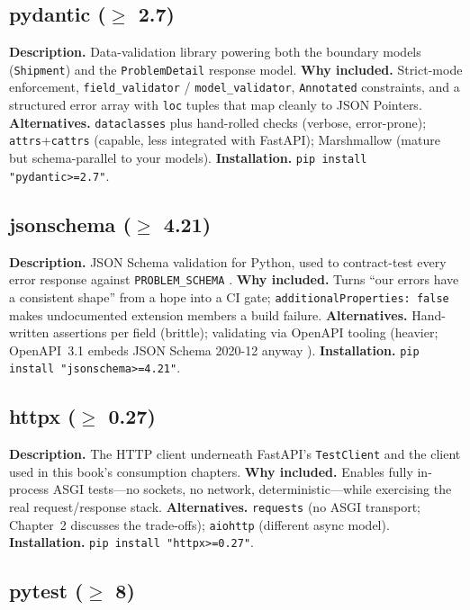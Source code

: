 \subsection{pydantic ($\geq$ 2.7)}

\textbf{Description.} Data-validation library powering both the boundary
models (\texttt{Shipment}) and the \texttt{ProblemDetail} response model.
\textbf{Why included.} Strict-mode enforcement, \texttt{field\_validator} /
\texttt{model\_validator}, \texttt{Annotated} constraints, and a structured
error array with \texttt{loc} tuples that map cleanly to JSON Pointers.
\textbf{Alternatives.} \texttt{dataclasses} plus hand-rolled checks (verbose,
error-prone); \texttt{attrs}+\texttt{cattrs} (capable, less integrated with
FastAPI); Marshmallow (mature but schema-parallel to your models).
\textbf{Installation.} \texttt{pip install "pydantic>=2.7"}.

\subsection{jsonschema ($\geq$ 4.21)}

\textbf{Description.} JSON Schema validation for Python, used to
contract-test every error response against \texttt{PROBLEM\_SCHEMA}
\cite{jsonschemadocs}. \textbf{Why included.} Turns ``our errors have a
consistent shape'' from a hope into a CI gate;
\texttt{additionalProperties: false} makes undocumented extension members a
build failure. \textbf{Alternatives.} Hand-written assertions per field
(brittle); validating via OpenAPI tooling (heavier; OpenAPI~3.1 embeds JSON
Schema 2020-12 anyway \cite{openapi31}). \textbf{Installation.}
\texttt{pip install "jsonschema>=4.21"}.

\subsection{httpx ($\geq$ 0.27)}

\textbf{Description.} The HTTP client underneath FastAPI's
\texttt{TestClient} and the client used in this book's consumption chapters.
\textbf{Why included.} Enables fully in-process ASGI tests---no sockets, no
network, deterministic---while exercising the real request/response stack.
\textbf{Alternatives.} \texttt{requests} (no ASGI transport; Chapter~2
discusses the trade-offs); \texttt{aiohttp} (different async model).
\textbf{Installation.} \texttt{pip install "httpx>=0.27"}.

\subsection{pytest ($\geq$ 8)}

